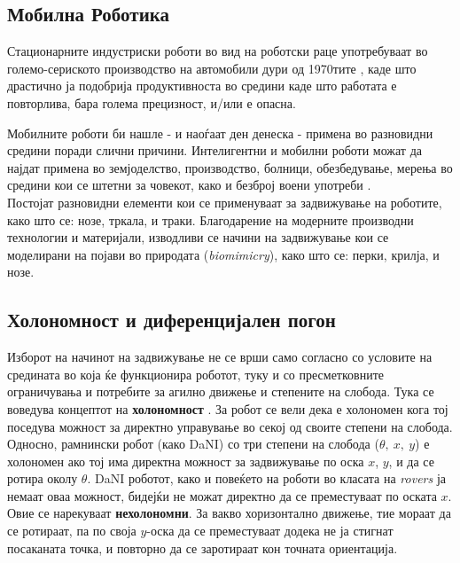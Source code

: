\documentclass[12pt]{article}
\begin{document}
  \subsection{Мобилна Роботика}
    Стационарните индустриски роботи во вид на роботски раце употребуваат во големо-сериското производство на автомобили дури од 1970тите \cite{robothistory}, каде што драстично ја подобрија продуктивноста во средини каде што работата е повторлива, бара голема прецизност, и/или е опасна.

    \bigbreak
    Мобилните роботи би нашле - и наоѓаат ден денеска - примена во разновидни средини поради слични причини. Интелигентни и мобилни роботи можат да најдат примена во земјоделство, производство, болници, обезбедување, мерења во средини кои се штетни за човекот, како и безброј воени употреби \cite{robotics}.\\
    Постојат разновидни елементи кои се применуваат за задвижување на роботите, како што се: нозе, тркала, и траки. Благодарение на модерните производни технологии и материјали, изводливи се начини на задвижување кои се моделирани на појави во природата (\textit{biomimicry}), како што се: перки, крилја, и нозе.

    \subsection{Холономност и диференцијален погон}
      Изборот на начинот на задвижување не се врши само согласно со условите на средината во која ќе функционира роботот, туку и со пресметковните ограничувања и потребите за агилно движење и степените на слобода. Тука се воведува концептот на \textbf{холономност} \cite{differential_drive_robots}. За робот се вели дека е холономен кога тој поседува можност за директно управување во секој од своите степени на слобода. Односно, рамнински робот (како DaNI) со три степени на слобода ($\theta,\ x,\ y$) е холономен ако тој има директна можност за задвижување по оска $x$, $y$, и да се ротира околу $\theta$. DaNI роботот, како и повеќето на роботи во класата на \textit{rovers} ја немаат оваа можност, бидејќи не можат директно да се преместуваат по оската $x$. Овие се нарекуваат \textbf{нехолономни}. За вакво хоризонтално движење, тие мораат да се ротираат, па по своја $y$-оска да се преместуваат додека не ја стигнат посаканата точка, и повторно да се заротираат кон точната ориентација.
\end{document}
